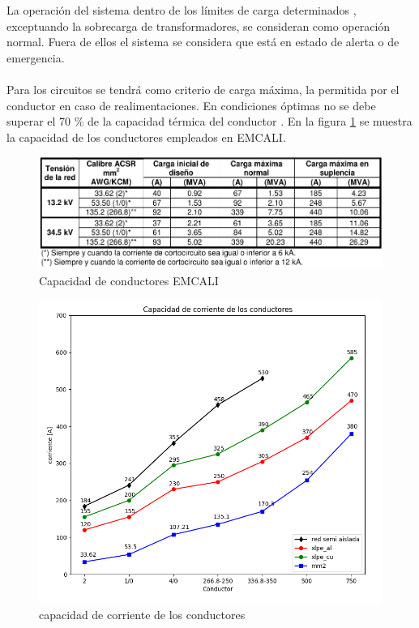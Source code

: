 \documentclass[a5paper]{book}%
\begin{document}
  La operación del sistema dentro de los límites de carga
  determinados , exceptuando la sobrecarga de
  transformadores, se consideran como operación normal. Fuera de ellos
  el sistema se considera que está en estado de alerta o de
  emergencia.\\\\
  
Para los circuitos se tendrá como criterio de carga máxima, la
permitida por el conductor en caso de realimentaciones. En condiciones
óptimas  no se debe superar el 70 \% de la capacidad térmica del
conductor \cite{MANOPEMCALI}. En la figura \ref{fig:capacidad_conductores_emcali} se
muestra la capacidad de los conductores empleados en EMCALI.

\begin{figure}[H]
  \centering
  \caption{Capacidad de conductores EMCALI}
  \label{fig:capacidad_conductores_emcali}
  \includegraphics[width=\linewidth]{aereos_emcali}
\end{figure}

\begin{figure}[H]
  \centering
  
  \caption{capacidad de corriente de los conductores}
  \label{fig:ampacidad}
  \includegraphics[width=\linewidth]{capacidad_corriete}
\end{figure}
\end{document}
